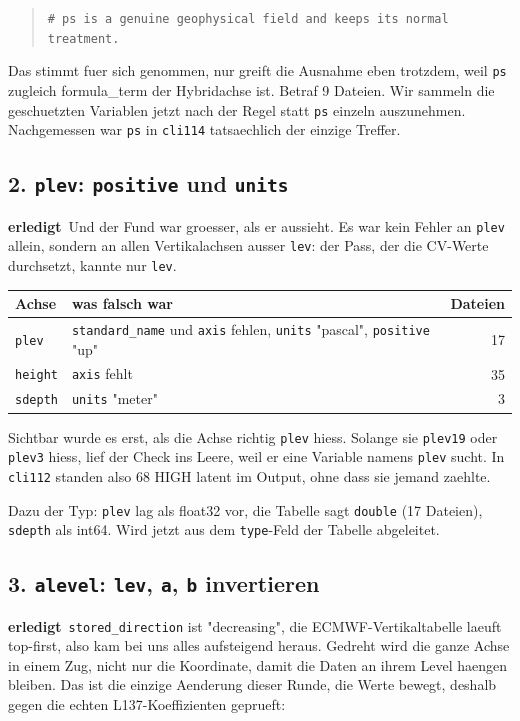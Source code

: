 \documentclass[11pt,a4paper]{article}
\newcommand{\code}[1]{\texttt{\small #1}}
\newcommand{\ok}{\textcolor{green!45!black}{\textbf{erledigt}}}
\begin{document}
\begin{quote}
\code{\# ps is a genuine geophysical field and keeps its normal treatment.}
\end{quote}

Das stimmt fuer sich genommen, nur greift die Ausnahme eben trotzdem, weil \code{ps}
zugleich formula\_term der Hybridachse ist. Betraf 9 Dateien. Wir sammeln die
geschuetzten Variablen jetzt nach der Regel statt \code{ps} einzeln auszunehmen.
Nachgemessen war \code{ps} in \code{cli114} tatsaechlich der einzige Treffer.

\subsection*{2. \code{plev}: \code{positive} und \code{units}}
\ok\ Und der Fund war groesser, als er aussieht. Es war kein Fehler an \code{plev}
allein, sondern an allen Vertikalachsen ausser \code{lev}: der Pass, der die
CV-Werte durchsetzt, kannte nur \code{lev}.

\begin{center}
\begin{tabular}{llr}
\toprule
\textbf{Achse} & \textbf{was falsch war} & \textbf{Dateien} \\
\midrule
\code{plev}   & \code{standard\_name} und \code{axis} fehlen, \code{units} "pascal", \code{positive} "up" & 17 \\
\code{height} & \code{axis} fehlt & 35 \\
\code{sdepth} & \code{units} "meter" & 3 \\
\bottomrule
\end{tabular}
\end{center}

Sichtbar wurde es erst, als die Achse richtig \code{plev} hiess. Solange sie
\code{plev19} oder \code{plev3} hiess, lief der Check ins Leere, weil er eine
Variable namens \code{plev} sucht. In \code{cli112} standen also 68 HIGH latent im
Output, ohne dass sie jemand zaehlte.

Dazu der Typ: \code{plev} lag als float32 vor, die Tabelle sagt \code{double}
(17 Dateien), \code{sdepth} als int64. Wird jetzt aus dem \code{type}-Feld der
Tabelle abgeleitet.

\subsection*{3. \code{alevel}: \code{lev}, \code{a}, \code{b} invertieren}
\ok\ \code{stored\_direction} ist "decreasing", die ECMWF-Vertikaltabelle laeuft
top-first, also kam bei uns alles aufsteigend heraus. Gedreht wird die ganze Achse in
einem Zug, nicht nur die Koordinate, damit die Daten an ihrem Level haengen bleiben.
Das ist die einzige Aenderung dieser Runde, die Werte bewegt, deshalb gegen die
echten L137-Koeffizienten geprueft:
\end{document}
